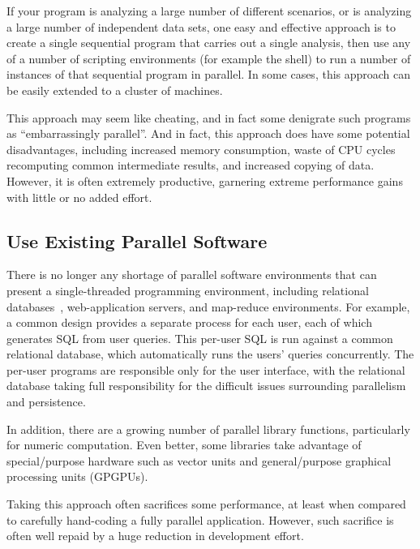 If your program is analyzing a large number of different scenarios,
or is analyzing a large number of independent data sets, one easy
and effective approach is to create a single sequential program that
carries out a single analysis, then use any of a number of scripting
environments (for example the  shell) to run a number of
instances of that sequential program in parallel.
In some cases, this approach can be easily extended to a cluster of
machines.

This approach may seem like cheating, and in fact some denigrate such
programs as ``embarrassingly parallel''.
And in fact, this approach does have some potential disadvantages,
including increased memory consumption, waste of CPU cycles recomputing
common intermediate results, and increased copying of data.
However, it is often  extremely productive, garnering extreme performance
gains with little or no added effort.

\subsection{Use Existing Parallel Software}
\label{sec:intro:Use Existing Parallel Software}

There is no longer any shortage of parallel software environments that
can present a single-threaded programming environment,
including relational
databases~\cite{Date82},
web-application servers, and map-reduce environments.
For example, a common design provides a separate process for each
user, each of which generates SQL from user queries.
This per-user SQL is run against a common relational database, which
automatically runs the users' queries concurrently.
The per-user programs are responsible only for the user interface,
with the relational database taking full responsibility for the
difficult issues surrounding parallelism and persistence.

In addition, there are a growing number of parallel library functions,
particularly for numeric computation.
Even better, some libraries take advantage of special\-/purpose
hardware such as vector units and general\-/purpose graphical processing
units (GPGPUs).

Taking this approach often sacrifices some performance, at least when
compared to carefully hand-coding a fully parallel application.
However, such sacrifice is often well repaid by a huge reduction in
development effort.

\QuickQuizEnd

